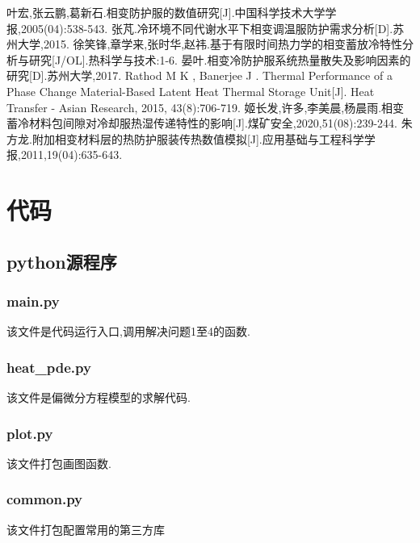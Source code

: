 \documentclass{whutmod}
\newcommand{\upcite}[1]{\textsuperscript{\textsuperscript{\cite{#1}}}}
\begin{document}
\appendix %
\begin{thebibliography}{9}%
	叶宏,张云鹏,葛新石.相变防护服的数值研究[J].中国科学技术大学学报,2005(04):538-543.
	张芃.冷环境不同代谢水平下相变调温服防护需求分析[D].苏州大学,2015.
	徐笑锋,章学来,张时华,赵祎.基于有限时间热力学的相变蓄放冷特性分析与研究[J/OL].热科学与技术:1-6.
	晏叶.相变冷防护服系统热量散失及影响因素的研究[D].苏州大学,2017.
	Rathod M K , Banerjee J . Thermal Performance of a Phase Change Material-Based Latent Heat Thermal Storage Unit[J]. Heat Transfer - Asian Research, 2015, 43(8):706-719.
	姬长发,许多,李美晨,杨晨雨.相变蓄冷材料包间隙对冷却服热湿传递特性的影响[J].煤矿安全,2020,51(08):239-244.
	朱方龙.附加相变材料层的热防护服装传热数值模拟[J].应用基础与工程科学学报,2011,19(04):635-643.
\end{thebibliography}
\newpage

\section{代码}
\subsection{python源程序}
\subsubsection{main.py}
该文件是代码运行入口,调用解决问题1至4的函数.


\subsubsection{heat\_pde.py}
该文件是偏微分方程模型的求解代码.

\subsubsection{plot.py}
该文件打包画图函数.

\subsubsection{common.py}
该文件打包配置常用的第三方库

\end{document}
